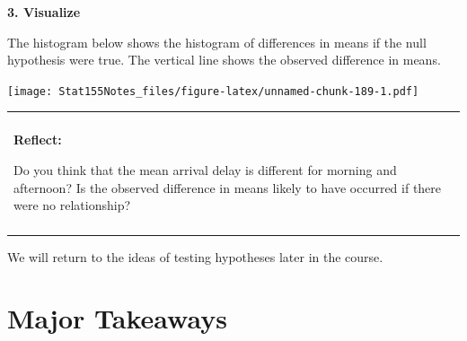 \documentclass[]{book}
\newenvironment{Shaded}{\begin{snugshade}}{\end{snugshade}}
\newcommand{\DataTypeTok}[1]{\textcolor[rgb]{0.13,0.29,0.53}{#1}}
\newcommand{\KeywordTok}[1]{\textcolor[rgb]{0.13,0.29,0.53}{\textbf{#1}}}
\newcommand{\NormalTok}[1]{#1}
\newcommand{\OperatorTok}[1]{\textcolor[rgb]{0.81,0.36,0.00}{\textbf{#1}}}
\newcommand{\StringTok}[1]{\textcolor[rgb]{0.31,0.60,0.02}{#1}}
\newenvironment{reflect}
{
    \begin{center}
    
    \begin{tabular}{|p{0.8\textwidth}|}
    \rowcolor{LightBlue}
    \hline\\
    \rowcolor{LightBlue}
    \textbf{Reflect:}
}
{
    \\\rowcolor{LightBlue}
    \\\hline
    \end{tabular} 
    \end{center}
}
\begin{document}
\textbf{3. Visualize}

The histogram below shows the histogram of differences in means if the null hypothesis were true. The vertical line shows the observed difference in means.

\begin{Shaded}
\end{Shaded}

\texttt{[image: Stat155Notes\_files/figure-latex/unnamed-chunk-189-1.pdf]}

\begin{reflect}
Do you think that the mean arrival delay is different for morning and
afternoon? Is the observed difference in means likely to have occurred
if there were no relationship?
\end{reflect}

We will return to the ideas of testing hypotheses later in the course.

\hypertarget{major-takeaways-3}{%
\section{Major Takeaways}\label{major-takeaways-3}}
\end{document}
